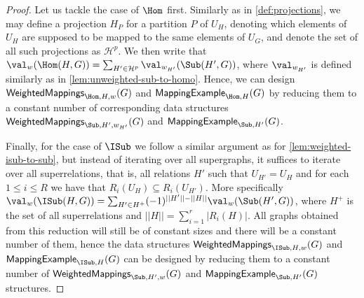 \begin{proof}
	Let us tackle the case of $\Hom$ first. Similarly as in \ref{def:projections}, we may define a projection $H_P$ for a partition $P$ of $U_H$, denoting which elements of $U_H$ are supposed to be mapped to the same elements of $U_G$, and denote the set of all such projections as $\mathcal{H}^p$. We then write that
	$\val_w(\Hom(H, G)) = \sum_{H' \in \mathcal{H}^p} \val_{w_{H'}}(\Sub(H', G))$,
	where $\val_{w_{H'}}$ is defined similarly as in \ref{lem:unweighted-sub-to-homo}. Hence, we can design $\mathsf{WeightedMappings}_{\Hom, H, w}(G)$ and $\mathsf{MappingExample}_{\Hom, H}(G)$ by reducing them to a constant number of corresponding data structures $\mathsf{WeightedMappings}_{\Sub, H', w_{H'}}(G)$ and $\mathsf{MappingExample}_{\Sub, H'}(G)$.
	
	Finally, for the case of $\ISub$ we follow a similar argument as for \ref{lem:weighted-isub-to-sub}, but instead of iterating over all supergraphs, it suffices to iterate over all superrelations, that is, all relations $H'$ such that $U_{H'} = U_H$ and for each $1 \le i \le R$ we have that $R_i(U_H) \subseteq R_i(U_{H'})$. More specifically $\val_w(\ISub(H, G)) = \sum_{H' \in H^+} (-1)^{||H'|| - ||H||} \val_w(\Sub(H', G))$, where $H^+$ is the set of all superrelations and $||H|| = \sum_{i=1}^{r} |R_i(H)|$. All graphs obtained from this reduction will still be of constant sizes and there will be a constant number of them, hence the data structures $\mathsf{WeightedMappings}_{\ISub, H, w}(G)$ and $\mathsf{MappingExample}_{\ISub, H}(G)$ can be designed by reducing them to a constant number of $\mathsf{WeightedMappings}_{\Sub, H', w}(G)$ and $\mathsf{MappingExample}_{\Sub, H'}(G)$ structures.
	
	
	
	
	
	
\end{proof}